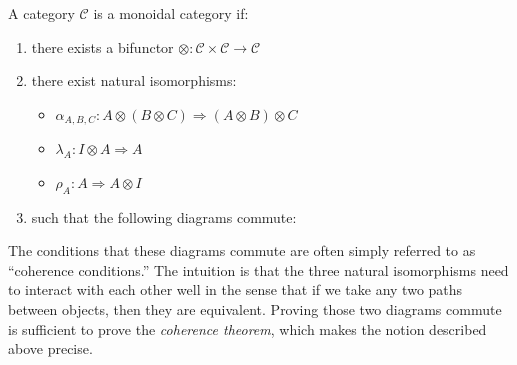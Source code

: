 \begin{definition}
    A category \(\mathcal{C}\) is a monoidal category if: 
    \begin{enumerate}
        \item there exists a bifunctor \(\otimes: 
            \mathcal{C} \times \mathcal{C} \to \mathcal{C}\)
        \item there exist natural isomorphisms:
            \begin{itemize}
                \item \( \alpha_{A, B, C} : A \otimes (B \otimes C) 
                    \Rightarrow (A \otimes B) \otimes C \)
                \item \( \lambda_{A} : I \otimes A \Rightarrow A \)
                \item \( \rho_A : A \Rightarrow A \otimes I \)
            \end{itemize}
        \item such that the following diagrams commute:
    \end{enumerate}

\end{definition}

The conditions that these diagrams commute are often simply referred 
to as ``coherence conditions.'' The intuition is that the 
three natural isomorphisms need to 
interact with each other well in the sense that if we take any 
two paths between objects, then they are equivalent. 
Proving those two diagrams commute is sufficient to prove the 
\emph{coherence theorem}, which makes the notion described 
above precise.

